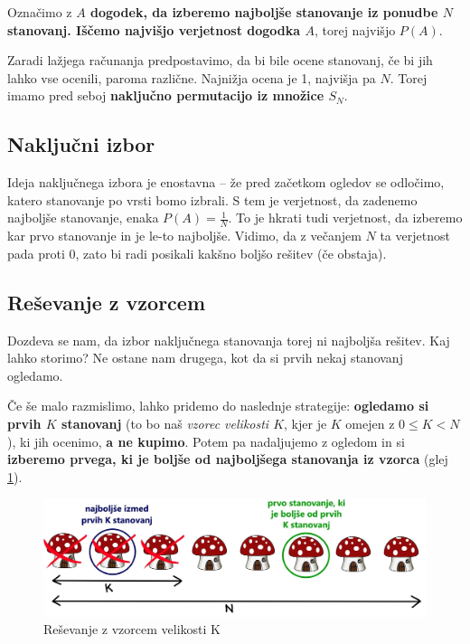 \documentclass[a4paper, 12pt, titlepage]{article}
\begin{document}
Označimo z \textbf{$A$ dogodek, da izberemo najboljše stanovanje iz ponudbe $N$ stanovanj. Iščemo najvišjo verjetnost dogodka $A$}, torej najvišjo $P(A)$.

Zaradi lažjega računanja predpostavimo, da bi bile ocene stanovanj, če bi jih lahko vse ocenili, paroma različne. Najnižja ocena je 1, najvišja pa $N$. Torej imamo pred seboj \textbf{naključno permutacijo iz množice $S_{N}$}.

\subsection{Naključni izbor}

Ideja naključnega izbora je enostavna -- že pred začetkom ogledov se odločimo, katero stanovanje po vrsti bomo izbrali. S tem je verjetnost, da zadenemo najboljše stanovanje, enaka $P(A)=\frac{1}{N}$. To je hkrati tudi verjetnost, da izberemo kar prvo stanovanje in je le-to najboljše.
Vidimo, da z večanjem $N$ ta verjetnost pada proti 0, zato bi radi posikali kakšno boljšo rešitev (če obstaja).

\subsection{Reševanje z vzorcem}

Dozdeva se nam, da izbor naključnega stanovanja torej ni najboljša rešitev. Kaj lahko storimo? Ne ostane nam drugega, kot da si prvih nekaj stanovanj ogledamo.

Če še malo razmislimo, lahko pridemo do naslednje strategije: \textbf{ogledamo si prvih $K$ stanovanj} (to bo naš \emph{vzorec velikosti $K$}, kjer je $K$ omejen z $0 \leq K < N$), ki jih ocenimo, \textbf{a ne kupimo}. Potem pa nadaljujemo z ogledom in si \textbf{izberemo prvega, ki je boljše od najboljšega stanovanja iz vzorca} (glej \ref{NinvzorecK}).

\begin{figure}
    \centering
    \includegraphics{slike/NinKformulacija2.jpg}
    \caption{Reševanje z vzorcem velikosti K}
    \label{NinvzorecK}
\end{figure}
\end{document}
